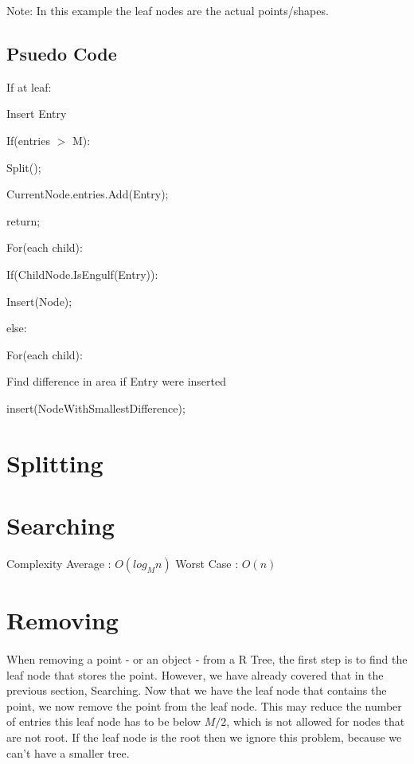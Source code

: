 \documentclass{article}
\begin{document}
Note: In this example the leaf nodes are the actual points/shapes.
\subsection*{Psuedo Code}
\begin{flushleft}
    
If at leaf:

\quad Insert Entry

\quad If(entries $>$ M):

\quad \quad Split();

\quad CurrentNode.entries.Add(Entry);

\quad return;


For(each child):


\quad If(ChildNode.IsEngulf(Entry)):

 \quad \quad Insert(Node);


else:

\quad For(each child):

    \quad \quad
    Find difference in area if Entry were inserted

    \quad insert(NodeWithSmallestDifference);
\end{flushleft}

\section{Splitting} 

\section{Searching}
Complexity
Average : $O(log_Mn)$
Worst Case : $O(n)$

\section{Removing}
\paragraph{}
When removing a point - or an object - from a R Tree, the first step is to find the leaf node that stores the point.
However, we have already covered that in the previous section, Searching. Now that we have the leaf node that contains
the point, we now remove the point from the leaf node. This may reduce the number of entries this leaf node has to be below
$M/2$, which is not allowed for nodes that are not root. If the leaf node is the root then we ignore this problem, because
we can't have a smaller tree.
\end{document}
